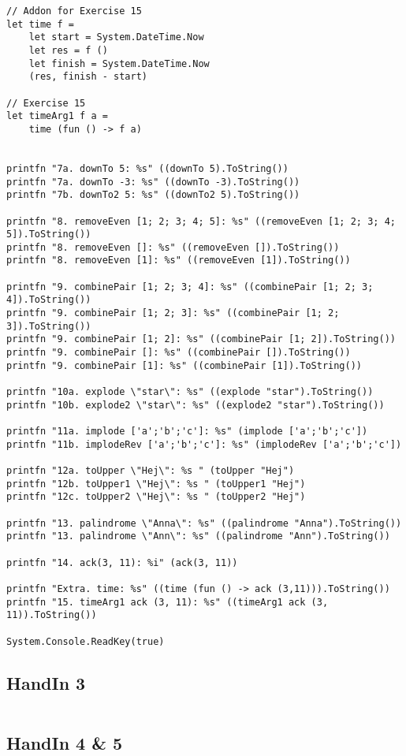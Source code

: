 \begin{lstlisting}
// Addon for Exercise 15
let time f =
    let start = System.DateTime.Now
    let res = f ()
    let finish = System.DateTime.Now
    (res, finish - start)

// Exercise 15
let timeArg1 f a =
    time (fun () -> f a)


printfn "7a. downTo 5: %s" ((downTo 5).ToString())
printfn "7a. downTo -3: %s" ((downTo -3).ToString())
printfn "7b. downTo2 5: %s" ((downTo2 5).ToString())

printfn "8. removeEven [1; 2; 3; 4; 5]: %s" ((removeEven [1; 2; 3; 4; 5]).ToString())
printfn "8. removeEven []: %s" ((removeEven []).ToString())
printfn "8. removeEven [1]: %s" ((removeEven [1]).ToString())

printfn "9. combinePair [1; 2; 3; 4]: %s" ((combinePair [1; 2; 3; 4]).ToString())
printfn "9. combinePair [1; 2; 3]: %s" ((combinePair [1; 2; 3]).ToString())
printfn "9. combinePair [1; 2]: %s" ((combinePair [1; 2]).ToString())
printfn "9. combinePair []: %s" ((combinePair []).ToString())
printfn "9. combinePair [1]: %s" ((combinePair [1]).ToString())

printfn "10a. explode \"star\": %s" ((explode "star").ToString())
printfn "10b. explode2 \"star\": %s" ((explode2 "star").ToString())

printfn "11a. implode ['a';'b';'c']: %s" (implode ['a';'b';'c'])
printfn "11b. implodeRev ['a';'b';'c']: %s" (implodeRev ['a';'b';'c'])

printfn "12a. toUpper \"Hej\": %s " (toUpper "Hej")
printfn "12b. toUpper1 \"Hej\": %s " (toUpper1 "Hej")
printfn "12c. toUpper2 \"Hej\": %s " (toUpper2 "Hej")

printfn "13. palindrome \"Anna\": %s" ((palindrome "Anna").ToString())
printfn "13. palindrome \"Ann\": %s" ((palindrome "Ann").ToString())

printfn "14. ack(3, 11): %i" (ack(3, 11))

printfn "Extra. time: %s" ((time (fun () -> ack (3,11))).ToString())
printfn "15. timeArg1 ack (3, 11): %s" ((timeArg1 ack (3, 11)).ToString())

System.Console.ReadKey(true)
\end{lstlisting}
\subsection{HandIn 3}
\label{Appendix_FSharp_Niklas_3}
\begin{lstlisting}
\end{lstlisting}
\subsection{HandIn 4 \& 5}
\label{Appendix_FSharp_Niklas_4and5}
\begin{lstlisting}
\end{lstlisting}